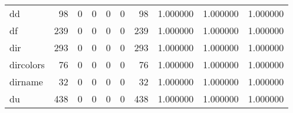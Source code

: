 \begin{longtable}{lrrrrrrrrr}
dd        &                                        98 &                                                  0 &                                                  0 &                                                  0 &                                                  0 &                                                 98 &                                           1.000000 &                               1.000000 &                             1.000000 \\
df        &                                       239 &                                                  0 &                                                  0 &                                                  0 &                                                  0 &                                                239 &                                           1.000000 &                               1.000000 &                             1.000000 \\
dir       &                                       293 &                                                  0 &                                                  0 &                                                  0 &                                                  0 &                                                293 &                                           1.000000 &                               1.000000 &                             1.000000 \\
dircolors &                                        76 &                                                  0 &                                                  0 &                                                  0 &                                                  0 &                                                 76 &                                           1.000000 &                               1.000000 &                             1.000000 \\
dirname   &                                        32 &                                                  0 &                                                  0 &                                                  0 &                                                  0 &                                                 32 &                                           1.000000 &                               1.000000 &                             1.000000 \\
du        &                                       438 &                                                  0 &                                                  0 &                                                  0 &                                                  0 &                                                438 &                                           1.000000 &                               1.000000 &                             1.000000 \\

\end{longtable}
